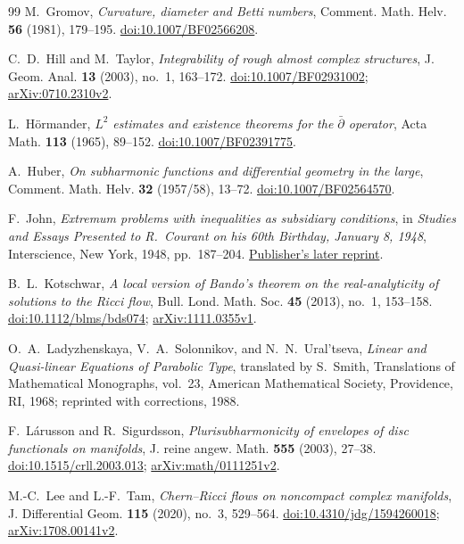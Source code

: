 \begin{thebibliography}{99}
M.~Gromov,
\emph{Curvature, diameter and Betti numbers},
Comment. Math. Helv. \textbf{56} (1981), 179--195.
\href{https://doi.org/10.1007/BF02566208}{doi:10.1007/BF02566208}.

C.~D.~Hill and M.~Taylor,
\emph{Integrability of rough almost complex structures},
J. Geom. Anal. \textbf{13} (2003), no.~1, 163--172.
\href{https://doi.org/10.1007/BF02931002}{doi:10.1007/BF02931002};
\href{https://arxiv.org/abs/0710.2310v2}{arXiv:0710.2310v2}.

L.~H\"ormander,
\emph{$L^2$ estimates and existence theorems for the
$\bar\partial$ operator},
Acta Math. \textbf{113} (1965), 89--152.
\href{https://doi.org/10.1007/BF02391775}{doi:10.1007/BF02391775}.

A.~Huber,
\emph{On subharmonic functions and differential geometry in the large},
Comment. Math. Helv. \textbf{32} (1957/58), 13--72.
\href{https://doi.org/10.1007/BF02564570}{doi:10.1007/BF02564570}.

F.~John,
\emph{Extremum problems with inequalities as subsidiary conditions},
in \emph{Studies and Essays Presented to R.~Courant on his 60th Birthday,
January 8, 1948}, Interscience, New York, 1948, pp.~187--204.
\href{https://doi.org/10.1007/978-3-0348-0439-4_9}{Publisher's later reprint}.

B.~L.~Kotschwar,
\emph{A local version of Bando's theorem on the real-analyticity
of solutions to the Ricci flow},
Bull. Lond. Math. Soc. \textbf{45} (2013), no.~1, 153--158.
\href{https://doi.org/10.1112/blms/bds074}{doi:10.1112/blms/bds074};
\href{https://arxiv.org/abs/1111.0355v1}{arXiv:1111.0355v1}.

O.~A.~Ladyzhenskaya, V.~A.~Solonnikov, and N.~N.~Ural'tseva,
\emph{Linear and Quasi-linear Equations of Parabolic Type},
translated by S.~Smith,
Translations of Mathematical Monographs, vol.~23,
American Mathematical Society, Providence, RI, 1968;
reprinted with corrections, 1988.

F.~L\'arusson and R.~Sigurdsson,
\emph{Plurisubharmonicity of envelopes of disc functionals on manifolds},
J. reine angew. Math. \textbf{555} (2003), 27--38.
\href{https://doi.org/10.1515/crll.2003.013}
{doi:10.1515/crll.2003.013};
\href{https://arxiv.org/abs/math/0111251v2}{arXiv:math/0111251v2}.

M.-C.~Lee and L.-F.~Tam,
\emph{Chern--Ricci flows on noncompact complex manifolds},
J. Differential Geom. \textbf{115} (2020), no.~3, 529--564.
\href{https://doi.org/10.4310/jdg/1594260018}
{doi:10.4310/jdg/1594260018};
\href{https://arxiv.org/abs/1708.00141v2}{arXiv:1708.00141v2}.


\end{thebibliography}
